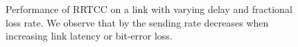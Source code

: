 \begin{figure}
  \centerline{
   }
   \centerline{
  }
  \caption{Performance of RRTCC on a link with varying delay and fractional
  loss rate. We observe that by the sending rate decreases when increasing
  link latency or bit-error loss. }
  \label{fig:rrtcc}
\end{figure}